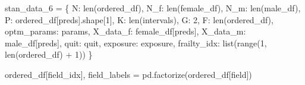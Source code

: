 \documentclass[
  letterpaper,
  DIV=11,
  numbers=noendperiod]{scrartcl}
\newenvironment{Shaded}{\begin{snugshade}}{\end{snugshade}}
\newcommand{\BuiltInTok}[1]{\textcolor[rgb]{0.00,0.23,0.31}{#1}}
\newcommand{\DecValTok}[1]{\textcolor[rgb]{0.68,0.00,0.00}{#1}}
\newcommand{\NormalTok}[1]{\textcolor[rgb]{0.00,0.23,0.31}{#1}}
\newcommand{\OperatorTok}[1]{\textcolor[rgb]{0.37,0.37,0.37}{#1}}
\newcommand{\StringTok}[1]{\textcolor[rgb]{0.13,0.47,0.30}{#1}}
\begin{document}
\begin{Shaded}
\begin{Highlighting}[]
\NormalTok{stan\_data\_6 }\OperatorTok{=}\NormalTok{ \{}
    \StringTok{\textquotesingle{}N\textquotesingle{}}\NormalTok{: }\BuiltInTok{len}\NormalTok{(ordered\_df),}
    \StringTok{\textquotesingle{}N\_f\textquotesingle{}}\NormalTok{: }\BuiltInTok{len}\NormalTok{(female\_df),}
    \StringTok{\textquotesingle{}N\_m\textquotesingle{}}\NormalTok{: }\BuiltInTok{len}\NormalTok{(male\_df),}
    \StringTok{\textquotesingle{}P\textquotesingle{}}\NormalTok{: ordered\_df[preds].shape[}\DecValTok{1}\NormalTok{],}
    \StringTok{\textquotesingle{}K\textquotesingle{}}\NormalTok{: }\BuiltInTok{len}\NormalTok{(intervals),}
    \StringTok{\textquotesingle{}G\textquotesingle{}}\NormalTok{: }\DecValTok{2}\NormalTok{,}
    \StringTok{\textquotesingle{}F\textquotesingle{}}\NormalTok{: }\BuiltInTok{len}\NormalTok{(ordered\_df),}
    \StringTok{\textquotesingle{}optm\_params\textquotesingle{}}\NormalTok{: params,}
    \StringTok{\textquotesingle{}X\_data\_f\textquotesingle{}}\NormalTok{: female\_df[preds],}
    \StringTok{\textquotesingle{}X\_data\_m\textquotesingle{}}\NormalTok{: male\_df[preds],}
    \StringTok{\textquotesingle{}quit\textquotesingle{}}\NormalTok{: quit,}
    \StringTok{\textquotesingle{}exposure\textquotesingle{}}\NormalTok{: exposure,}
    \StringTok{\textquotesingle{}frailty\_idx\textquotesingle{}}\NormalTok{: }\BuiltInTok{list}\NormalTok{(}\BuiltInTok{range}\NormalTok{(}\DecValTok{1}\NormalTok{, }\BuiltInTok{len}\NormalTok{(ordered\_df) }\OperatorTok{+} \DecValTok{1}\NormalTok{))}
\NormalTok{\}}

\NormalTok{ordered\_df[}\StringTok{\textquotesingle{}field\_idx\textquotesingle{}}\NormalTok{], field\_labels }\OperatorTok{=}\NormalTok{ pd.factorize(ordered\_df[}\StringTok{\textquotesingle{}field\textquotesingle{}}\NormalTok{])}


\end{Highlighting}
\end{Shaded}
\end{document}
